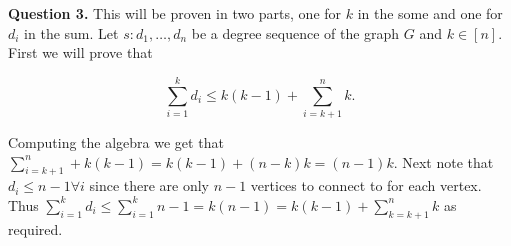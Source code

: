 \documentclass[letterpaper, reqno,11pt]{article}
\begin{document}
{\medskip\noindent\bf Question 3.} This will be proven in two parts, one for $k$ in the some and one for $d_i$ in the sum. Let $s: d_1,\ldots,d_n$ be a degree sequence of the graph $G$ and $k\in[n]$. First we will prove that 

\[
    \sum_{i=1}^{k}d_i\leq k(k-1)+\sum_{i=k+1}^{n}k
.\]

Computing the algebra we get that $\sum_{i=k+1}^{n}+k(k-1)=k(k-1)+\left( n-k \right) k=(n-1)k$. Next note that $d_i\leq n-1\forall i$ since there are only $n-1$ vertices to connect to for each vertex. Thus $\sum_{i=1}^{k}d_i\leq \sum_{i=1}^{k}n-1=k(n-1)=k(k-1)+\sum_{k=k+1}^{n}k$ as required. 
\end{document}
